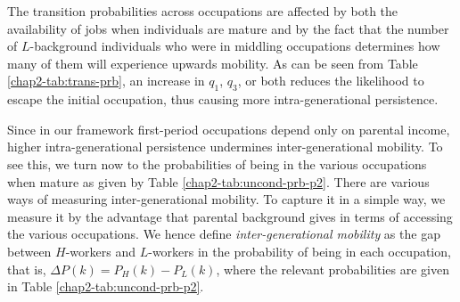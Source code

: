 The transition probabilities across occupations are affected by both the availability of jobs when individuals are mature and by the fact that the number of $L$-background individuals who were in middling occupations determines how many of them will experience upwards mobility. As can be seen from Table \ref{chap2-tab:trans-prb}, an increase in $q_1$, $q_3$, or both reduces the likelihood to escape the initial occupation, thus causing more intra-generational persistence. 

Since in our framework first-period occupations depend only on parental income, higher intra-generational persistence undermines inter-generational mobility. To see this, we turn now to the probabilities of being in the various occupations when mature as given by Table \ref{chap2-tab:uncond-prb-p2}. There are various ways of measuring inter-generational mobility. To capture it in a simple way, we measure it by the advantage that parental background gives in terms of accessing the various occupations. We hence define \textit{inter-generational mobility} as the gap between $H$-workers and $L$-workers in the probability of being in each occupation, that is, $\Delta P(k) = P_H(k)-P_L(k)$, where the relevant probabilities are given in Table \ref{chap2-tab:uncond-prb-p2}.


